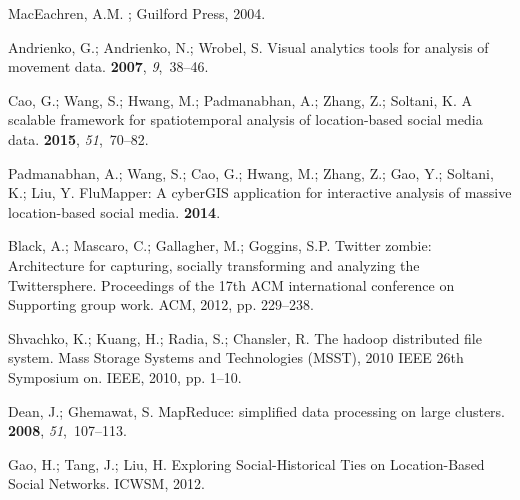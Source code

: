 \documentclass[ijgi,article,accept,moreauthors,pdftex,10pt,a4paper]{mdpi}
\theoremstyle{mdpi}
\newcounter{ex}
\newcounter{re}
\theoremstyle{mdpidefinition}
\begin{document}
\begin{thebibliography}{-------}
MacEachren, A.M.
;
  Guilford Press,  2004.

Andrienko, G.; Andrienko, N.; Wrobel, S.
\newblock Visual analytics tools for analysis of movement data.
 {\bf 2007}, {\em 9},~38--46.

Cao, G.; Wang, S.; Hwang, M.; Padmanabhan, A.; Zhang, Z.; Soltani, K.
\newblock A scalable framework for spatiotemporal analysis of location-based
  social media data.
 {\bf 2015}, {\em
  51},~70--82.

Padmanabhan, A.; Wang, S.; Cao, G.; Hwang, M.; Zhang, Z.; Gao, Y.; Soltani, K.;
  Liu, Y.
\newblock FluMapper: A cyberGIS application for interactive analysis of massive
  location-based social media.
 {\bf
  2014}.

Black, A.; Mascaro, C.; Gallagher, M.; Goggins, S.P.
\newblock Twitter zombie: Architecture for capturing, socially transforming and
  analyzing the Twittersphere.
\newblock  Proceedings of the 17th ACM international conference on Supporting
  group work. ACM,  2012, pp. 229--238.

Shvachko, K.; Kuang, H.; Radia, S.; Chansler, R.
\newblock The hadoop distributed file system.
\newblock  Mass Storage Systems and Technologies (MSST), 2010 IEEE 26th
  Symposium on. IEEE,  2010, pp. 1--10.

Dean, J.; Ghemawat, S.
\newblock MapReduce: simplified data processing on large clusters.
 {\bf 2008}, {\em 51},~107--113.

Gao, H.; Tang, J.; Liu, H.
\newblock Exploring Social-Historical Ties on Location-Based Social Networks.
\newblock  ICWSM,  2012.


\end{thebibliography}
\end{document}
